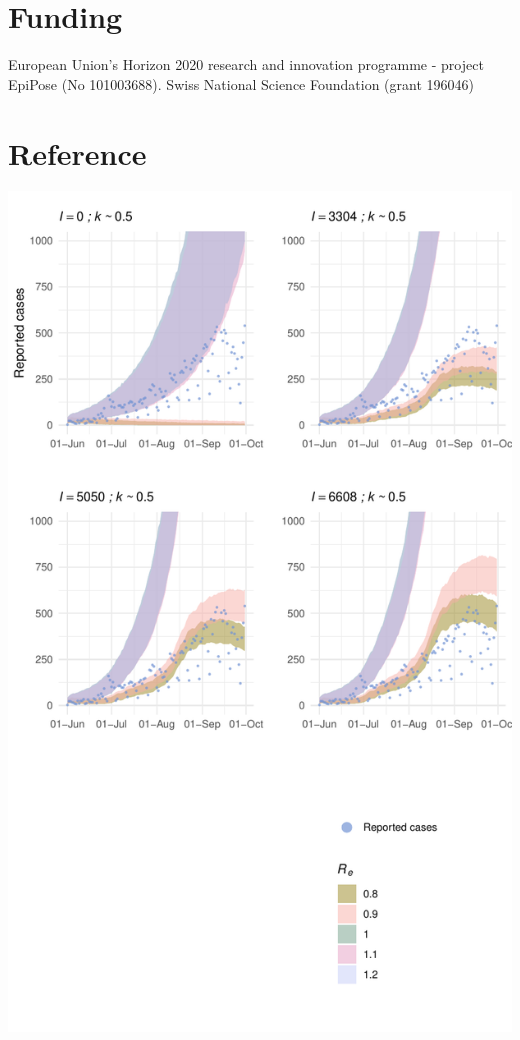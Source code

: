 \documentclass[10pt, a4paper, twoside]{article}
\begin{document}
\begin{multicols}{2}
\section{Funding}
European Union’s Horizon 2020 research and innovation programme - project EpiPose (No 101003688). Swiss National Science Foundation (grant 196046)

\section{Reference}




\end{multicols}

\clearpage
\begin{suppfigure}[h]
\centering
\includegraphics[scale=0.4]{SF1_2021-04-19.pdf}

\end{suppfigure}
\end{document}
